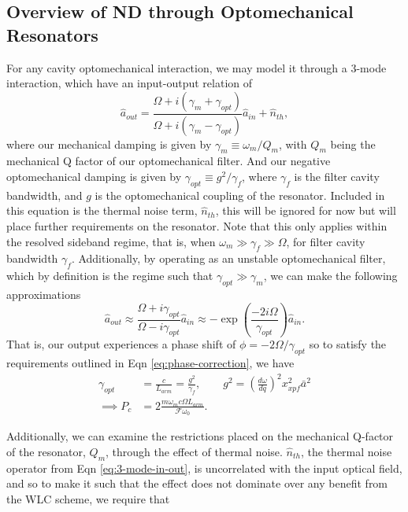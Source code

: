 \documentclass[aps,  
                a4paper, 
                amsmath, 
                amssymb, 
                preprint,
                tightenlines,  
                amsfonts,
                nofootinbib,
                onecolumn,
                titlepage,
                10pt
            ]{revtex4-2}
\begin{document}
    \subsection{Overview of ND through Optomechanical Resonators}
    For any cavity optomechanical interaction, we may model it through a 3-mode interaction, which have an input-output relation of
    \begin{equation}
        \label{eq:3-mode-in-out}
        \hat{a}_{out}=\frac{\Omega+i(\gamma_m+\gamma_{opt})}{\Omega+i(\gamma_m-\gamma_{opt})}\hat{a}_{in} + \hat{n}_{th},
    \end{equation}
    where our mechanical damping is given by $\gamma_m\equiv\omega_m/Q_m$, with $Q_m$ being the mechanical Q factor of our optomechanical filter. And our negative optomechanical damping is given by $\gamma_{opt}\equiv g^2/\gamma_f$, where $\gamma_f$ is the filter cavity bandwidth, and $g$ is the optomechanical coupling of the resonator. Included in this equation is the thermal noise term, $\hat{n}_{th}$, this will be ignored for now but will place further requirements on the resonator. Note that this only applies within the resolved sideband regime, that is, when $\omega_m\gg\gamma_f\gg\Omega$, for filter cavity bandwidth $\gamma_f$. Additionally, by operating as an unstable optomechanical filter, which by definition is the regime such that $\gamma_{opt}\gg\gamma_m$, we can make the following approximations
    \begin{equation}
        \label{eq:in-out-approx}
        \hat{a}_{out}\approx\frac{\Omega+i\gamma_{opt}}{\Omega-i\gamma_{opt}}\hat{a}_{in}\approx-\exp{\left(\frac{-2i\Omega}{\gamma_{opt}}\right)}\hat{a}_{in}.
    \end{equation}
    That is, our output experiences a phase shift of $\phi=-2\Omega/\gamma_{opt}$ so to satisfy the requirements outlined in Eqn \eqref{eq:phase-correction}, we have
    \begin{align}
        \label{eq:gamma-opt-req}
        \gamma_{opt}&=\frac{c}{L_{arm}}=\frac{g^2}{\gamma_f}, \qquad g^2=\left(\frac{d\omega}{dq}\right)^2x_{xpf}^2\bar{a}^2\\
        \label{eq:filter-power-req}
        \implies P_c&=2\frac{m\omega_m c \Omega L_{arm}}{\mathcal{F}\omega_0}.
    \end{align}
    \par
    Additionally, we can examine the restrictions placed on the mechanical Q-factor of the resonator, $Q_m$, through the effect of thermal noise. $\hat{n}_{th}$, the thermal noise operator from Eqn \eqref{eq:3-mode-in-out}, is uncorrelated with the input optical field, and so to make it such that the effect does not dominate over any benefit from the WLC scheme, we require that
\end{document}
